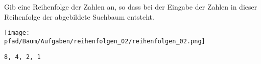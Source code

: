 \question[1]
Gib eine Reihenfolge der Zahlen an, so dass bei der
Eingabe der Zahlen in dieser Reihenfolge
der abgebildete Suchbaum entsteht.

\texttt{[image: \\pfad/Baum/Aufgaben/reihenfolgen\_02/reihenfolgen\_02.png]}
\begin{solutionbox}{2cm}
\begin{lstlisting}
8, 4, 2, 1
\end{lstlisting}
\end{solutionbox}
